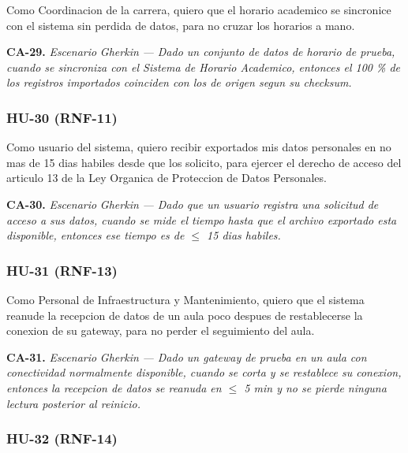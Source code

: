 
Como Coordinacion de la carrera, quiero que el horario academico se sincronice con el sistema sin perdida de datos, para no cruzar los horarios a mano.


\textbf{CA-29.} \textit{Escenario }\textit{Gherkin}\textit{ --- Dado un conjunto de datos de horario de prueba, cuando se sincroniza con el Sistema de Horario Academico, entonces el 100 \% de los registros importados coinciden con los de origen segun su checksum.}

\subsubsection*{HU-30 (RNF-11)}


Como usuario del sistema, quiero recibir exportados mis datos personales en no mas de 15 dias habiles desde que los solicito, para ejercer el derecho de acceso del articulo 13 de la Ley Organica de Proteccion de Datos Personales.


\textbf{CA-30.} \textit{Escenario }\textit{Gherkin}\textit{ --- Dado que un usuario registra una solicitud de acceso a sus datos, cuando se mide el tiempo hasta que el archivo exportado esta disponible, entonces ese tiempo es de $\leq{}$ 15 dias habiles.}

\subsubsection*{HU-31 (RNF-13)}


Como Personal de Infraestructura y Mantenimiento, quiero que el sistema reanude la recepcion de datos de un aula poco despues de restablecerse la conexion de su gateway, para no perder el seguimiento del aula.


\textbf{CA-31.} \textit{Escenario }\textit{Gherkin}\textit{ --- Dado un gateway de prueba en un aula con conectividad normalmente disponible, cuando se corta y se restablece su conexion, entonces la recepcion de datos se reanuda en $\leq{}$ 5 min y no se pierde ninguna lectura posterior al reinicio.}

\subsubsection*{HU-32 (RNF-14)}


